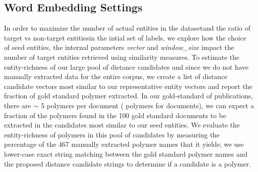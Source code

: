 \subsection{Word Embedding Settings}
In order to maximize the number of actual entities in the dataset\textemdash and the ratio of target vs non-target entities\textemdash in the intial set of labels,
we explore how the choice of seed entities, the internal parameters \textit{vector} and \textit{window_size}  impact the number of target entities retrieved using similarity measures.
To estimate the entity-richness of our large pool of distance candidates and since we do not have manually extracted data for the entire corpus, we create a list of  distance candidate vectors most similar to our representative entity vectors and report the fraction of gold standard polymer extracted. 
In our gold-standard of publications, there are $\sim$ 5 polymers per document ( polymers for  documents), we can expect a fraction of the polymers found in the 100 gold standard documents to be extracted in the  candidates most similar to our seed entities.
We evaluate the entity-richness of polymers in this pool of candidates by measuring the percentage of the 467 manually extracted polymer names that it yields;
we use lower-case exact string matching between the gold standard polymer names and the proposed distance candidate strings to determine if a candidate is a polymer.


